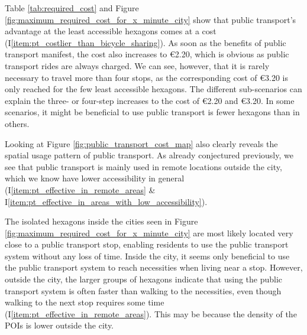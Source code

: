 Table \ref{tab:required_cost} and Figure \ref{fig:maximum_required_cost_for_x_minute_city} show that public transport's advantage at the least accessible hexagons comes at a cost (I\ref{item:pt_costlier_than_bicycle_sharing}).
As soon as the benefits of public transport manifest, the cost also increases to \euro{2.20}, which is obvious as public transport rides are always charged.
We can see, however, that it is rarely necessary to travel more than four stops, as the corresponding cost of \euro{3.20} is only reached for the few least accessible hexagons.
The different sub-scenarios can explain the three- or four-step increases to the cost of \euro{2.20} and \euro{3.20}.
In some scenarios, it might be beneficial to use public transport is fewer hexagons than in others.

Looking at Figure \ref{fig:public_transport_cost_map} also clearly reveals the spatial usage pattern of public transport.
As already conjectured previously, we see that public transport is mainly used in remote locations outside the city, which we know have lower accessibility in general (I\ref{item:pt_effective_in_remote_areas} \& I\ref{item:pt_effective_in_areas_with_low_accessibility}).

The isolated hexagons inside the cities seen in Figure \ref{fig:maximum_required_cost_for_x_minute_city} are most likely located very close to a public transport stop, enabling residents to use the public transport system without any loss of time.
Inside the city, it seems only beneficial to use the public transport system to reach necessities when living near a stop.
However, outside the city, the larger groups of hexagons indicate that using the public transport system is often faster than walking to the necessities, even though walking to the next stop requires some time (I\ref{item:pt_effective_in_remote_areas}).
This may be because the density of the POIs is lower outside the city.

